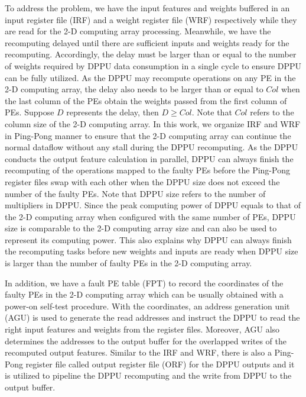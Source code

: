 To address the problem, we have the input features and weights buffered in an input register file (IRF) and a weight register file (WRF) respectively while they are read for the 2-D computing array processing. Meanwhile, we have the recomputing delayed until there are sufficient inputs and weights ready for the recomputing. Accordingly, the delay must be larger than or equal to the number of weights required by DPPU data consumption in a single cycle to ensure DPPU can be fully utilized. As the DPPU may recompute operations on any PE in the 2-D computing array, the delay also needs to be larger than or equal to $Col$ when the last column of the PEs obtain the weights passed from the first column of PEs. Suppose $D$ represents the delay, then $D \geq Col$. Note that $Col$ refers to the column size of the 2-D computing array. In this work, we organize IRF and WRF in Ping-Pong manner to ensure that the 2-D computing array can continue the normal dataflow without any stall during the DPPU recomputing. As the DPPU conducts the output feature calculation in parallel, DPPU can always finish the recomputing of the operations mapped to the faulty PEs before the Ping-Pong register files swap with each other when the DPPU size does not exceed the number of the faulty PEs. Note that DPPU size refers to the number of multipliers in DPPU. Since the peak computing power of DPPU equals to that of the 2-D computing array when configured with the same number of PEs, DPPU size is comparable to the 2-D computing array size and can also be used to represent its computing power. This also explains why DPPU can always finish the recomputing tasks before new weights and inputs are ready when DPPU size is larger than the number of faulty PEs in the 2-D computing array. 

In addition, we have a fault PE table (FPT) to record the coordinates of the faulty PEs in the 2-D computing array which can be usually obtained with a power-on self-test procedure. With the coordinates, an address generation unit (AGU) is used to generate the read addresses and instruct the DPPU to read the right input features and weights from the register files. Moreover, AGU also determines the addresses to the output buffer for the overlapped writes of the recomputed output features. Similar to the IRF and WRF, there is also a Ping-Pong register file called output register file (ORF) for the DPPU outputs and it is utilized to pipeline the DPPU recomputing and the write from DPPU to the output buffer.

